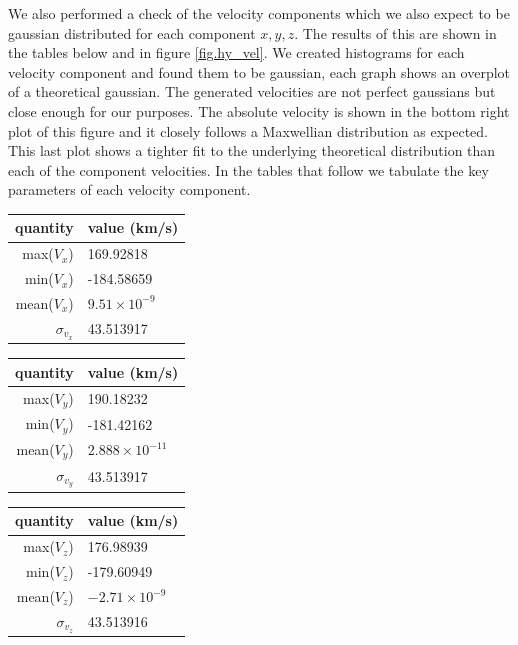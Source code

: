 We also performed a check of the velocity components which we also expect to be gaussian distributed for each component $x,y,z$. The results of this are shown in the tables below and in figure \ref{fig.hy_vel}. We created histograms for each velocity component and found them to be gaussian, each graph shows an overplot of a theoretical gaussian. The generated velocities are not perfect gaussians but close enough for our purposes. The absolute velocity is shown in the bottom right plot of this figure and it closely follows a Maxwellian distribution as expected. This last plot shows a tighter fit to the underlying theoretical distribution than each of the component velocities. In the tables that follow we tabulate the key parameters of each velocity component.

\vspace*{1cm}
\begin{center}
\begin{tabular}{|r|l|}
  \hline
  quantity & value (km/s) \\ \hline
  max($V_{x}$)  & 169.92818 \\
  min($V_{x}$)  & -184.58659  \\
  mean($V_{x}$) & $9.51\times10^{-9}$ \\
  $\sigma_{v_x}$ & 43.513917 \\
  \hline
\end{tabular}
\end{center}

\begin{center}
\begin{tabular}{|r|l|}
  \hline
  quantity & value (km/s) \\ \hline
  max($V_{y}$)  & 190.18232 \\
  min($V_{y}$)  & -181.42162 \\
  mean($V_{y}$) & $2.888\times10^{-11}$ \\
  $\sigma_{v_y}$ & 43.513917 \\
  \hline
\end{tabular}
\end{center}

\begin{center}
\begin{tabular}{|r|l|}
  \hline
  quantity & value (km/s) \\ \hline
  max($V_{z}$)  & 176.98939 \\
  min($V_{z}$)  & -179.60949 \\
  mean($V_{z}$) & $-2.71\times10^{-9}$ \\
  $\sigma_{v_z}$ & 43.513916 \\
  \hline
\end{tabular}
\end{center}
\vspace*{1cm}

